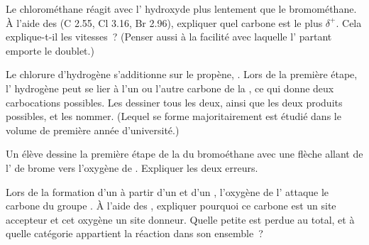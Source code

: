 \begin{exercise}[$\star\star$]\label{exo:g12:curly-arrows:11}
Le chlorométhane réagit avec l' hydroxyde plus lentement que le
bromométhane. À l'aide des  (C 2.55, Cl 3.16, Br 2.96),
expliquer quel carbone est le plus $\delta^+$. Cela explique-t-il les
vitesses~? (Penser aussi à la facilité avec laquelle l' partant
emporte le doublet.)
\end{exercise}

\begin{exercise}[$\star\star\star$]\label{exo:g12:curly-arrows:12}
Le chlorure d'hydrogène s'additionne sur le propène, .
Lors de la première étape, l' hydrogène peut se lier à l'un ou
l'autre carbone de la , ce qui donne deux carbocations
possibles. Les dessiner tous les deux, ainsi que les deux produits
possibles, et les nommer. (Lequel se forme majoritairement est étudié
dans le volume de première année d'université.)
\end{exercise}

\begin{exercise}[$\star\star\star$]\label{exo:g12:curly-arrows:13}
Un élève dessine la première étape de la  du bromoéthane
avec une flèche allant de l' de brome vers l'oxygène de .
Expliquer les deux erreurs.
\end{exercise}

\begin{exercise}[$\star\star\star$]\label{exo:g12:curly-arrows:14}
Lors de la formation d'un  à partir d'un  et d'un
, l'oxygène de l' attaque le carbone du groupe . À
l'aide des , expliquer pourquoi ce carbone est un site
accepteur et cet oxygène un site donneur. Quelle petite  est
perdue au total, et à quelle catégorie appartient la réaction dans son
ensemble~?
\end{exercise}

